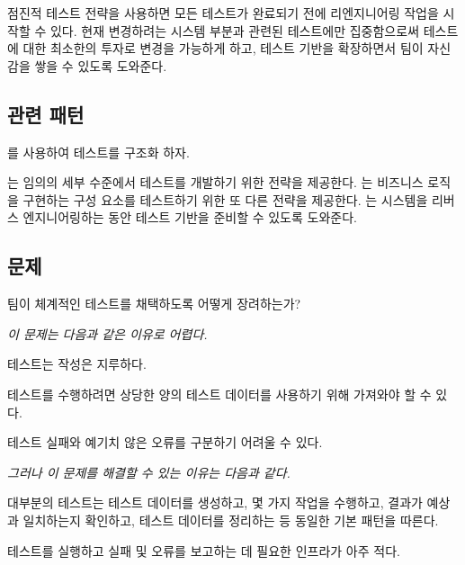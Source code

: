 \documentclass[a4paper,10pt,twoside]{book}
\begin{document}
점진적 테스트 전략을 사용하면 모든 테스트가 완료되기 전에 리엔지니어링 작업을 시작할 수 있다. 현재 변경하려는 시스템 부분과 관련된 테스트에만 집중함으로써 테스트에 대한 최소한의 투자로 변경을 가능하게 하고, 테스트 기반을 확장하면서 팀이 자신감을 쌓을 수 있도록 도와준다.

\subsection*{관련 패턴}

를 사용하여 테스트를 구조화 하자. 

는 임의의 세부 수준에서 테스트를 개발하기 위한 전략을 제공한다. 는 비즈니스 로직을 구현하는 구성 요소를 테스트하기 위한 또 다른 전략을 제공한다. 는 시스템을 리버스 엔지니어링하는 동안 테스트 기반을 준비할 수 있도록 도와준다.



\subsection*{문제}

팀이 체계적인 테스트를 채택하도록 어떻게 장려하는가?

\emph{이 문제는 다음과 같은 이유로 어렵다.} 

\begin{bulletlist}
\item 테스트는 작성은 지루하다.
\item 테스트를 수행하려면 상당한 양의 테스트 데이터를 사용하기 위해 가져와야 할 수 있다.
\item 테스트 실패와 예기치 않은 오류를 구분하기 어려울 수 있다.
\end{bulletlist}

\emph{그러나 이 문제를 해결할 수 있는 이유는 다음과 같다.}

\begin{bulletlist}
\item 대부분의 테스트는 테스트 데이터를 생성하고, 몇 가지 작업을 수행하고, 결과가 예상과 일치하는지 확인하고, 테스트 데이터를 정리하는 등 동일한 기본 패턴을 따른다.
\item 테스트를 실행하고 실패 및 오류를 보고하는 데 필요한 인프라가 아주 적다.
\end{bulletlist}
\end{document}
